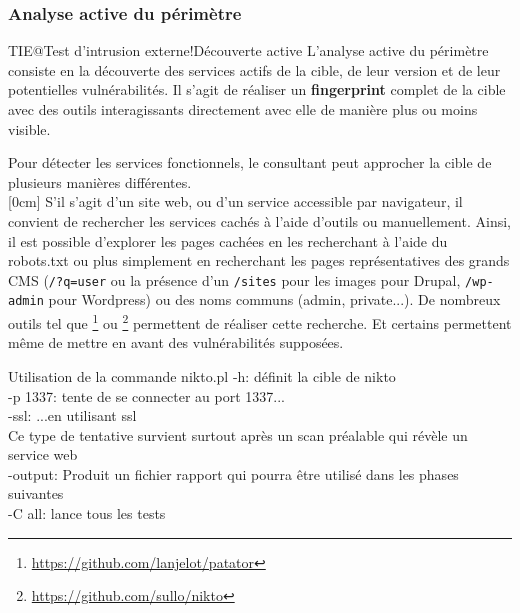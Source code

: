 \documentclass[twoside,a4paper,12pt,titlepage]{book}
\newcommand{\MarginPar}[2]{\marginnote{\scriptsize #1}[#2]}
\begin{document}
\subsubsection{Analyse active du périmètre}
\begin{Define}{TIE@Test d'intrusion externe!Découverte active} L'analyse active du périmètre consiste en la découverte des services actifs de la cible, de leur version et de leur potentielles vulnérabilités. Il s'agit de réaliser un \textbf{fingerprint} complet de la cible avec des outils interagissants directement avec elle de manière plus ou moins visible.\end{Define}
	Pour détecter les services fonctionnels, le consultant peut approcher la cible de plusieurs manières différentes.\\
	\MarginPar{\textbf{Directory Discovery}}{0cm}
	S'il s'agit d'un site web, ou d'un service accessible par navigateur, il convient de rechercher les services cachés à l'aide d'outils ou manuellement. Ainsi, il est possible d'explorer les pages cachées en les recherchant à l'aide du robots.txt ou plus simplement en recherchant les pages représentatives des grands CMS (\texttt{/?q=user} ou la présence d'un \texttt{/sites} pour les images pour Drupal, \texttt{/wp-admin} pour Wordpress) ou des noms communs (admin, private...). De nombreux outils tel que \footnote{\url{https://github.com/lanjelot/patator}} ou \footnote{\url{https://github.com/sullo/nikto}} permettent de réaliser cette recherche. Et certains permettent même de mettre en avant des vulnérabilités supposées.
\begin{FlagConsole}{Utilisation de la commande nikto.pl}
	\tcblower
	-h: définit la cible de nikto\\
	-p 1337: tente de se connecter au port 1337... \\
	-ssl: ...en utilisant ssl\\
		Ce type de tentative survient surtout après un scan préalable qui révèle un service web\\
	-output: Produit un fichier rapport qui pourra être utilisé dans les phases suivantes\\
	-C all: lance tous les tests
\end{FlagConsole}
\end{document}
